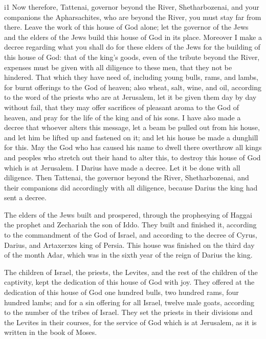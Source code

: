 i1 Now therefore, Tattenai, governor beyond the River,
Shetharbozenai, and your companions the Apharsachites, who are beyond
the River, you must stay far from there.  Leave the work
of this house of God alone; let the governor of the Jews and the elders
of the Jews build this house of God in its place. 
Moreover I make a decree regarding what you shall do for these elders of
the Jews for the building of this house of God: that of the king's
goods, even of the tribute beyond the River, expenses must be given with
all diligence to these men, that they not be hindered. 
That which they have need of, including young bulls, rams, and lambs,
for burnt offerings to the God of heaven; also wheat, salt, wine, and
oil, according to the word of the priests who are at Jerusalem, let it
be given them day by day without fail,  that they may
offer sacrifices of pleasant aroma to the God of heaven, and pray for
the life of the king and of his sons.  I have also made a
decree that whoever alters this message, let a beam be pulled out from
his house, and let him be lifted up and fastened on it; and let his
house be made a dunghill for this.  May the God who has
caused his name to dwell there overthrow all kings and peoples who
stretch out their hand to alter this, to destroy this house of God which
is at Jerusalem. I Darius have made a decree. Let it be done with all
diligence.  Then Tattenai, the governor beyond the River,
Shetharbozenai, and their companions did accordingly with all diligence,
because Darius the king had sent a decree.

 The elders of the Jews built and prospered, through the
prophesying of Haggai the prophet and Zechariah the son of Iddo. They
built and finished it, according to the commandment of the God of
Israel, and according to the decree of Cyrus, Darius, and Artaxerxes
king of Persia.  This house was finished on the third day
of the month Adar, which was in the sixth year of the reign of Darius
the king.

 The children of Israel, the priests, the Levites, and
the rest of the children of the captivity, kept the dedication of this
house of God with joy.  They offered at the dedication of
this house of God one hundred bulls, two hundred rams, four hundred
lambs; and for a sin offering for all Israel, twelve male goats,
according to the number of the tribes of Israel.  They
set the priests in their divisions and the Levites in their courses, for
the service of God which is at Jerusalem, as it is written in the book
of Moses.

